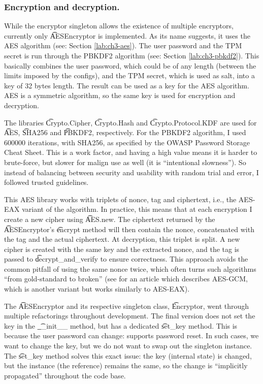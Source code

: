 \subsubsection{Encryption and decryption.} \label{lab:ch4-encryptor}

While the encryptor singleton allows the existence of multiple encryptors, currently only \t{AESEncryptor} is implemented.
As its name suggests, it uses the AES algorithm (see: Section \ref{lab:ch3-aes}).
The user password and the TPM secret is run through the PBKDF2 algorithm (see: Section \ref{lab:ch3-pbkdf2}).
This basically combines the user password, which could be of any length (between the limits imposed by the configs), and the TPM secret, which is used as salt, into a key of 32 bytes length.
The result can be used as a key for the AES algorithm.
AES is a symmetric algorithm, so the same key is used for encryption and decryption.

The libraries \t{Crypto.Cipher}, \t{Crypto.Hash} and \t{Crypto.Protocol.KDF} are used for \t{AES}, \t{SHA256} and \t{PBKDF2}, respectively.
For the PBKDF2 algorithm, I used 600000 iterations, with SHA256, as specified by the OWASP Password Storage Cheat Sheet\cite{pbkdf2-600000-iterations}.
This is a work factor, and having a high value means it is harder to brute-force, but slower for malign use as well (it is ``intentional slowness'').
So instead of balancing between security and usability with random trial and error, I followed trusted guidelines.

This AES library works with triplets of nonce, tag and ciphertext, i.e., the AES-EAX variant of the algorithm.
In practice, this means that at each encryption I create a new cipher using \t{AES.new}.
The ciphertext returned by the \t{AESEncryptor}'s \t{encrypt} method will then contain the nonce, concatenated with the tag and the actual ciphertext.
At decryption, this triplet is split.
A new cipher is created with the same key and the extracted nonce, and the tag is passed to \t{decrypt\_and\_verify} to ensure correctness.
This approach avoids the common pitfall of using the same nonce twice, which often turns such algorithms ``from gold-standard to broken'' (see \cite{aes-gcm} for an article which describes AES-GCM, which is another variant but works similarly to AES-EAX).

The \t{AESEncryptor} and its respective singleton class, \t{Encryptor}, went through multiple refactorings throughout development.
The final version does not set the key in the \t{\_\_init\_\_} method, but has a dedicated \t{set\_key} method.
This is because the user password can change: \app{} supports password reset.
In such cases, we want to change the key, but we do not want to swap out the singleton instance.
The \t{set\_key} method solves this exact issue: the key (internal state) is changed, but the instance (the reference) remains the same, so the change is ``implicitly propagated'' throughout the code base.


